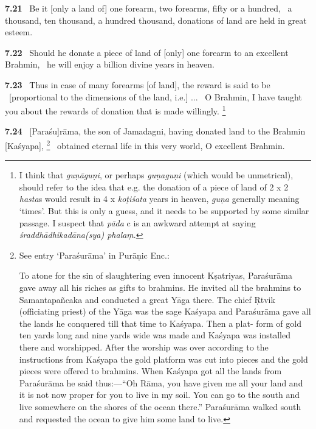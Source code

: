 \documentclass{article}
\newcommand{\skt}[1]{\textit{#1}}
\begin{document}
\textbf{7.21}%
\ Be it [only a land of] one forearm, two forearms, fifty or a hundred,%
\ a thousand, ten thousand, a hundred thousand, donations of land are held in great esteem.%


\textbf{7.22}%
\ Should he donate a piece of land of [only] one forearm to an excellent Brahmin,%
\ he will enjoy a billion divine years in heaven.%


\textbf{7.23}%
\ Thus in case of many forearms [of land], the reward is said to be%
\                         [proportional to the dimensions of the land, i.e.] ...%
\ O Brahmin, I have taught you about the rewards of donation that is made willingly.%
\footnote{I think that \skt{guṇāguṇi}, or perhaps \skt{guṇaguṇi} (which would be unmetrical), should refer to the idea                        that e.g. the donation of a piece of land of 2 x 2 \skt{hasta}s would result in                         4 x \skt{koṭiśata} years in heaven, \skt{guṇa} generally meaning `times'. But this is only a guess, and                        it needs to be supported by some similar passage.                        I suspect that \skt{pāda} c is an awkward attempt at saying \skt{śraddhādhikadāna(sya) phalaṃ}. }%


\textbf{7.24}%
\ [Paraśu]rāma, the son of Jamadagni, having donated land to the Brahmin [Kaśyapa],%
\footnote{See entry `Paraśurāma' in Purāṇic Enc.:                

                                To atone for the sin of slaughtering even                                innocent Kṣatriyas, Paraśurāma gave away all his                                riches as gifts to brahmins. He invited all the brahmins                                to Samantapañcaka and conducted a great Yāga there.                                The chief Ṛtvik (officiating priest) of the Yāga was                                the sage Kaśyapa and Paraśurāma gave all the lands                                he conquered till that time to Kaśyapa. Then a plat-                                form of gold ten yards long and nine yards wide was                                made and Kaśyapa was installed there and worshipped.                                After the worship was over according to the instructions                                from Kaśyapa the gold platform was cut into pieces                                and the gold pieces were offered to brahmins.                                When Kaśyapa got all the lands from Paraśurāma he                                said thus:—“Oh Rāma, you have given me all your                                land and it is not now proper for you to live in my                                soil. You can go to the south and live somewhere on                                the shores of the ocean there.” Paraśurāma walked                                south and requested the ocean to give him some land to                                live.  }%
\ obtained eternal life in this very world, O excellent Brahmin.%
\end{document}

